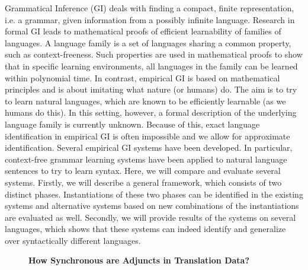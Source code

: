 \documentclass[10pt, a4paper, twopage, headinclude, footinclude, BCOR5mm]{scrartcl}
\begin{document}
        \begin{table}[t!]
    \end{table}

\noindent
Grammatical Inference (GI) deals with finding a compact, finite representation, i.e. a grammar, given information from a possibly infinite language.  Research in formal GI leads to mathematical proofs of efficient learnability of families of languages.  A language family is a set of languages sharing a common property, such as context-freeness.  Such properties are used in mathematical proofs to show that in specific learning environments, all languages in the family can be learned within polynomial time.  In contrast, empirical GI is based on mathematical principles and is about imitating what nature (or humans) do.  The aim is to try to learn natural languages, which are known to be efficiently learnable (as we humans do this).  In this setting, however, a formal description of the underlying language family is currently unknown. Because of this, exact language identification in empirical GI is often impossible and we allow for approximate identification.  Several empirical GI systems have been developed.  In particular, context-free grammar learning systems have been applied to natural language sentences to try to learn syntax.  Here, we will compare and evaluate several systems.  Firstly, we will describe a general framework, which consists of two distinct phases.  Instantiations of these two phases can be identified in the existing systems and alternative systems based on new combinations of the instantiations are evaluated as well.  Secondly, we will provide results of the systems on several languages, which shows that these systems can indeed identify and generalize over syntactically different languages. 


\newpage

\begin{figure}[t!]
\centering
\large\textbf{How Synchronous are Adjuncts in Translation Data?}
\vspace*{0.5cm}
\end{figure}
\end{document}
